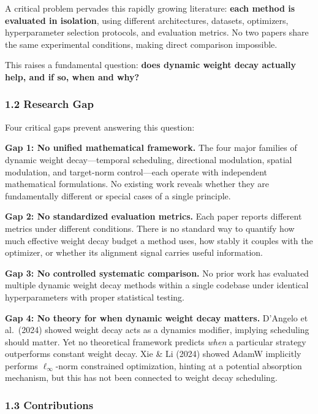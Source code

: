 \documentclass[
]{article}
\begin{document}
A critical problem pervades this rapidly growing literature:
\textbf{each method is evaluated in isolation}, using different
architectures, datasets, optimizers, hyperparameter selection protocols,
and evaluation metrics. No two papers share the same experimental
conditions, making direct comparison impossible.

This raises a fundamental question: \textbf{does dynamic weight decay
actually help, and if so, when and why?}

\hypertarget{research-gap}{%
\subsubsection{1.2 Research Gap}\label{research-gap}}

Four critical gaps prevent answering this question:

\textbf{Gap 1: No unified mathematical framework.} The four major
families of dynamic weight decay---temporal scheduling, directional
modulation, spatial modulation, and target-norm control---each operate
with independent mathematical formulations. No existing work reveals
whether they are fundamentally different or special cases of a single
principle.

\textbf{Gap 2: No standardized evaluation metrics.} Each paper reports
different metrics under different conditions. There is no standard way
to quantify how much effective weight decay budget a method uses, how
stably it couples with the optimizer, or whether its alignment signal
carries useful information.

\textbf{Gap 3: No controlled systematic comparison.} No prior work has
evaluated multiple dynamic weight decay methods within a single codebase
under identical hyperparameters with proper statistical testing.

\textbf{Gap 4: No theory for when dynamic weight decay matters.}
D'Angelo et al.~(2024) showed weight decay acts as a dynamics modifier,
implying scheduling should matter. Yet no theoretical framework predicts
\emph{when} a particular strategy outperforms constant weight decay. Xie
\& Li (2024) showed AdamW implicitly performs \(\ell_\infty\)-norm
constrained optimization, hinting at a potential absorption mechanism,
but this has not been connected to weight decay scheduling.

\hypertarget{contributions}{%
\subsubsection{1.3 Contributions}\label{contributions}}
\end{document}
